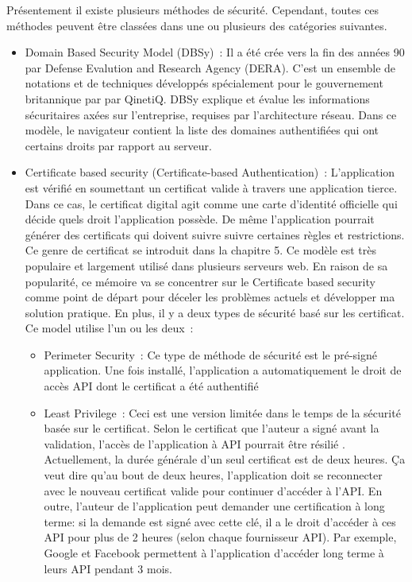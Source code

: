  Présentement il existe plusieurs méthodes de sécurité. Cependant, toutes ces méthodes peuvent être classées dans une ou plusieurs des catégories suivantes.
 \begin{itemize}
 \item Domain Based Security Model (DBSy) : Il a été crée vers la fin des années 90 par Defense Evalution and Research Agency (DERA). C'est un ensemble de notations et de techniques développés spécialement pour le gouvernement britannique par par QinetiQ. DBSy explique et évalue les informations sécuritaires axées sur l'entreprise, requises par l'architecture réseau. Dans ce modèle, le navigateur contient la liste des domaines authentifiées qui ont certains droits par rapport au serveur. 
 \item Certificate based security (Certificate-based Authentication) : L'application est vérifié en soumettant un certificat valide à travers une application tierce. Dans ce cas, le certificat digital agit comme une carte d'identité officielle qui décide quels droit l'application possède. De même l'application pourrait générer des certificats qui doivent suivre suivre certaines règles et restrictions. Ce genre de certificat se introduit dans la chapitre 5. Ce modèle est très populaire et largement utilisé dans plusieurs serveurs web. En raison de sa popularité, ce mémoire va se  concentrer sur le Certificate based security  comme point de départ pour déceler les problèmes actuels et développer ma solution pratique. En plus, il y a deux types de sécurité basé sur les certificat. Ce model utilise l'un ou les deux :
 \begin{itemize}
 \item Perimeter Security : Ce type de méthode de sécurité est le pré-signé application. Une fois installé, l'application a automatiquement le droit de accès API dont le certificat a été authentifié
 \item Least Privilege : Ceci est une version limitée dans le temps de  la sécurité basée sur le certificat. Selon le certificat que l'auteur  a signé avant la validation, l’accès de l'application à API pourrait être résilié \cite{11}. Actuellement, la durée générale d'un seul certificat est de deux heures. Ça veut dire qu'au bout de deux heures, l'application doit se reconnecter avec le nouveau certificat valide pour continuer d’accéder à l'API. En outre, l'auteur de l'application peut demander une certification à long terme: si la demande est signé avec cette clé, il a le droit d'accéder à ces API pour plus de 2 heures (selon chaque fournisseur API). Par exemple, Google et Facebook permettent à l'application d'accéder long terme à leurs API pendant 3 mois.

\end{itemize}
\end{itemize}
